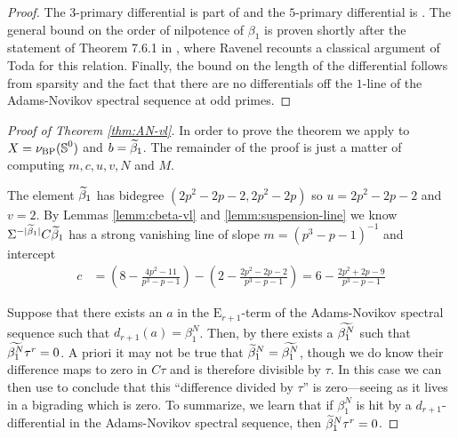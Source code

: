 \begin{proof}
    The $3$-primary differential is part of \cite[Theorem 7.5.3]{GreenBook} and the $5$-primary differential is \cite[Theorem 7.6.1]{GreenBook}. 
    The general bound on the order of nilpotence of $\beta_1$ is proven shortly after the statement of Theorem 7.6.1 in \cite{GreenBook}, where Ravenel recounts a classical argument of Toda for this relation. Finally, the bound on the length of the differential follows from sparsity and the fact that there are no differentials off the $1$-line of the Adams-Novikov spectral sequence at odd primes.
\end{proof}


\begin{proof}[Proof of Theorem \ref{thm:AN-vl}]
    In order to prove the theorem we apply  to $X = \nu_{\mathrm{BP}} (\operatorname{\mathbb{S}}^{0})$ and $b = \wt{\beta}_1$. The remainder of the proof is just a matter of computing $m,c,u,v,N$ and $M$.

  The element $\wt{\beta}_1$ has bidegree $(2p^2-2p-2,2p^2-2p)$ so $u = 2p^2 -2p - 2$ and $v = 2$. By Lemmas \ref{lemm:cbeta-vl} and \ref{lemm:suspension-line} we know $\Sigma^{-|\wt{\beta}_1|}C\wt{\beta}_1$ has a strong vanishing line of slope $m = (p^3 - p - 1)^{-1}$ and intercept
  \begin{align*}
    c &= \left(8 - \frac{4p^2 - 11}{p^3 - p - 1} \right) - \left( 2 - \frac{2p^2 - 2p - 2}{p^3 - p - 1} \right) =  6 - \frac{2p^2+2p-9}{p^3 - p - 1}
  \end{align*}

    Suppose that there exists an $a$ in the $\mathrm{E}_{r+1}$-term of the Adams-Novikov spectral sequence such that $d_{r+1}(a) = \beta_1^N$. Then, by  there exists a $\wt{\beta_1^N}$ such that $\wt{\beta_1^N}\tau^{r} = 0$. A priori it may not be true that $\wt{\beta}_1^N = \wt{\beta_1^N}$, though we do know their difference maps to zero in $C\tau$ and is therefore divisible by $\tau$. In this case we can then use  to conclude that this ``difference divided by $\tau$'' is zero---seeing as it lives in a bigrading which is zero. To summarize, we learn that if $\beta_1^N$ is hit by a $d_{r+1}$-differential in the Adams-Novikov spectral sequence, then $\wt{\beta}_1^N \tau^r = 0$.
  


\end{proof}
